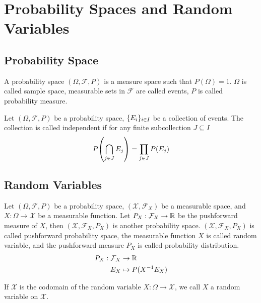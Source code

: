 \documentclass{report}
\begin{document}
\section{Probability Spaces and Random Variables}

\subsection{Probability Space}

\begin{definition}
    A probability space $(\Omega, \mathcal{F}, P)$ is a measure space such that $P(\Omega) = 1$. $\Omega$ is called sample space, measurable sets in $\mathcal{F}$ are called events, $P$ is called probability measure.    
\end{definition}

\begin{definition}
    Let $(\Omega, \mathcal{F}, P)$ be a probability space, $\{E_i\}_{i \in I}$ be a collection of events. The collection is called independent if for any finite subcollection $J \subseteq I$
    $$
        P\tuple*{\bigcap_{j \in J} E_j} = \prod_{j \in J} P(E_j)
    $$
\end{definition}

\subsection{Random Variables}

\begin{definition}
    Let $(\Omega, \mathcal{F}, P)$ be a probability space, $(\mathcal{X}, \mathcal{F}_X)$ be a measurable space, and $X: \Omega \to \mathcal{X}$ be a measurable function. Let $P_X: \mathcal{F}_X \to \mathbb{R}$ be the pushforward measure of $X$, then $(\mathcal{X}, \mathcal{F}_X, P_X)$ is another probability space. $(\mathcal{X}, \mathcal{F}_X, P_X)$ is called pushforward probability space, the measurable function $X$ is called random variable, and the pushforward measure $P_X$ is called probability distribution.
    \begin{align*}
        P_X:    \mathcal{F}_X &\to \mathbb{R} \\
                E_X &\mapsto P(X^{-1} E_X)
    \end{align*}
    
    If $\mathcal{X}$ is the codomain of the random variable $X: \Omega \to \mathcal{X}$, we call $X$ a random variable on $\mathcal{X}$.
\end{definition}
\end{document}

